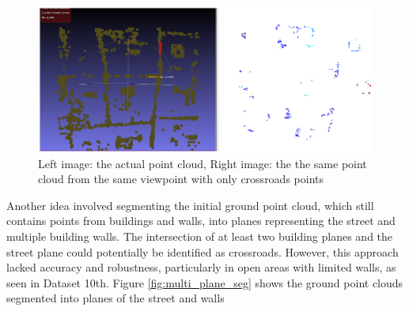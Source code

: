 \documentclass[11pt]{article}
\begin{document}
    \begin{figure}
    \centering
    \includegraphics[width=\textwidth,height=\textheight,keepaspectratio]{images/experiment/crossroads_det_1}
    \caption{
        Left image: the actual point cloud,
        Right image: the the same point cloud from the same viewpoint with only crossroads points
    }
    \label{fig:crossroads_det_1}
    \end{figure}

    Another idea involved segmenting the initial ground point cloud, which still contains points from buildings
    and walls, into planes representing the street and multiple building walls. The intersection of at least two building planes
    and the street plane could potentially be identified as crossroads. However, this approach lacked accuracy and
    robustness, particularly in open areas with limited walls, as seen in Dataset 10th. Figure \ref{fig:multi_plane_seg} shows
    the ground point clouds segmented into planes of the street and walls
\end{document}
